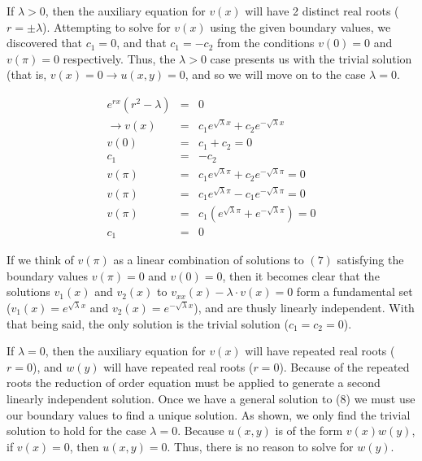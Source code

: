 \documentclass[12pt, a4paper]{article}
\theoremstyle{plain}
\theoremstyle{definition}
\theoremstyle{remark}
\begin{document}
\vspace{.25in}

If $\lambda >0$, then the auxiliary equation for $v(x)$ will have 2 distinct real roots ($r = \pm \lambda$). Attempting to solve for $v(x)$ using the given boundary values, we discovered that $c_1=0$, and that $c_1=-c_2$ from the conditions $v(0)=0$ and $v(\pi)=0$ respectively. Thus, the $\lambda>0$ case presents us with the trivial solution (that is, $v(x)=0 \rightarrow u(x,y)=0$, and so we will move on to the case $\lambda=0$. 

\begin{eqnarray*}
e^{rx}(r^2-\lambda) &=& 0 \\
\rightarrow v(x) &=& c_1e^{\sqrt\lambda x}+c_2e^{-\sqrt{\lambda} x}\\
v(0) &=& c_1+c_2 = 0 \\
c_1 &=& -c_2\\
v(\pi) &=& c_1e^{\sqrt\lambda \pi}+c_2e^{-\sqrt{\lambda} \pi} = 0\\
v(\pi) &=& c_1e^{\sqrt\lambda \pi}-c_1e^{-\sqrt{\lambda} \pi} = 0\\
v(\pi) &=& c_1(e^{\sqrt\lambda \pi}+e^{-\sqrt{\lambda} \pi}) = 0\\
c_1 &=& 0
\end{eqnarray*}

If we think of $v(\pi)$ as a linear combination of solutions to $(7)$ satisfying the boundary values $v(\pi)=0$ and $v(0)=0$, then it becomes clear that the solutions $v_1(x)$ and $v_2(x)$ to $v_{xx}(x) - \lambda \cdot v(x) = 0$ form a fundamental set ($v_1(x)=e^{\sqrt\lambda x}$ and $v_2(x)=e^{-\sqrt{\lambda} x}$), and are thusly linearly independent. With that being said, the only solution is the trivial solution ($c_1=c_2=0$).

\newpage

If $\lambda =0$, then the auxiliary equation for $v(x)$ will have repeated real roots ($r = 0$), and $w(y)$ will have repeated real roots ($r = 0$). Because of the repeated roots the reduction of order equation must be applied to generate a second linearly independent solution. Once we have a general solution to (8) we must use our boundary values to find a unique solution. As shown, we only find the trivial solution to hold for the case $\lambda =0$. Because $u(x,y)$ is of the form $v(x)w(y)$, if $v(x)=0$, then $u(x,y)=0$. Thus, there is no reason to solve for $w(y)$.
\end{document}
